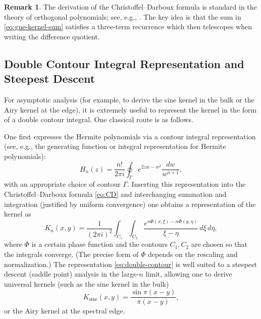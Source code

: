 \documentclass[letterpaper,11pt,oneside,reqno]{article}
\numberwithin{equation}{section}
\theoremstyle{definition}
\newtheorem{remark}[proposition]{Remark}
\begin{document}
\begin{remark}
The derivation of the Christoffel--Darboux formula is standard in the theory of orthogonal polynomials; see, e.g., \cite{szego1975orthogonal}. The key idea is that the sum in \eqref{eq:gue-kernel-sum} satisfies a three-term recurrence which then telescopes when writing the difference quotient.
\end{remark}

\subsection{Double Contour Integral Representation and Steepest Descent}
For asymptotic analysis (for example, to derive the sine kernel in the bulk or the Airy kernel at the edge), it is extremely useful to represent the kernel in the form of a double contour integral. One classical route is as follows.

One first expresses the Hermite polynomials via a contour integral representation (see, e.g., the generating function or integral representation for Hermite polynomials):
\[
H_n(z)=\frac{n!}{2\pi i}\oint_\Gamma e^{2zw-w^2}\frac{dw}{w^{n+1}},
\]
with an appropriate choice of contour $\Gamma$. Inserting this representation into the Christoffel--Darboux formula \eqref{eq:CD} and interchanging summation and integration (justified by uniform convergence) one obtains a representation of the kernel as
\begin{equation}
\label{eq:double-contour}
K_n(x,y)=\frac{1}{(2\pi i)^2}\int_{C_1}\int_{C_2} \frac{e^{n\Phi(x,\xi)-n\Phi(y,\eta)}}{\xi-\eta}\,d\xi\,d\eta,
\end{equation}
where $\Phi$ is a certain phase function and the contours $C_1,C_2$ are chosen so that the integrals converge. (The precise form of $\Phi$ depends on the rescaling and normalization.) The representation \eqref{eq:double-contour} is well suited to a steepest descent (saddle point) analysis in the large-$n$ limit, allowing one to derive universal kernels (such as the sine kernel in the bulk)
\[
K_{\mathrm{sine}}(x,y)=\frac{\sin\pi(x-y)}{\pi(x-y)},
\]
or the Airy kernel at the spectral edge.

\end{document}
